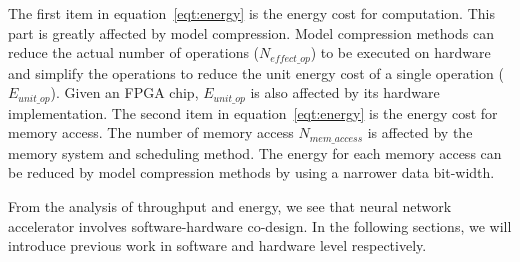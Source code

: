 The first item in equation~\ref{eqt:energy} is the energy cost for computation. This part is greatly affected by model compression. Model compression methods can reduce the actual number of operations ($N_{effect\_op}$) to be executed on hardware and simplify the operations to reduce the unit energy cost of a single operation ($E_{unit\_op}$). Given an FPGA chip, $E_{unit\_op}$ is also affected by its hardware implementation. The second item in equation~\ref{eqt:energy} is the energy cost for memory access. The number of memory access $N_{mem\_access}$ is affected by the memory system and scheduling method. The energy for each memory access can be reduced by model compression methods by using a narrower data bit-width. 

From the analysis of throughput and energy, we see that neural network accelerator involves software-hardware co-design. In the following sections, we will introduce previous work in software and hardware level respectively.
